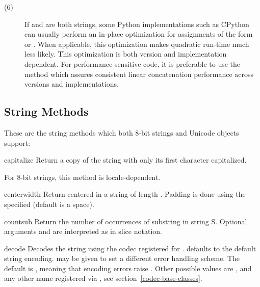 \begin{description}
\item[(6)] If  and  are both strings, some Python
implementations such as CPython can usually perform an in-place optimization
for assignments of the form  or
.  When applicable, this optimization makes
quadratic run-time much less likely.  This optimization is both version
and implementation dependent.  For performance sensitive code, it is
preferable to use the  method which assures consistent
linear concatenation performance across versions and implementations.

\end{description}


\subsection{String Methods \label{string-methods}}

These are the string methods which both 8-bit strings and Unicode
objects support:

\begin{methoddesc}[string]{capitalize}{}
Return a copy of the string with only its first character capitalized.

For 8-bit strings, this method is locale-dependent.
\end{methoddesc}

\begin{methoddesc}[string]{center}{width}
Return centered in a string of length . Padding is done
using the specified  (default is a space).
\end{methoddesc}

\begin{methoddesc}[string]{count}{sub}
Return the number of occurrences of substring  in string
S.  Optional arguments  and
 are interpreted as in slice notation.
\end{methoddesc}

\begin{methoddesc}[string]{decode}{}
Decodes the string using the codec registered for .
 defaults to the default string encoding.  
may be given to set a different error handling scheme.  The default is
, meaning that encoding errors raise
.  Other possible values are ,
 and any other name registered via
, see section~\ref{codec-base-classes}.
\end{methoddesc}

